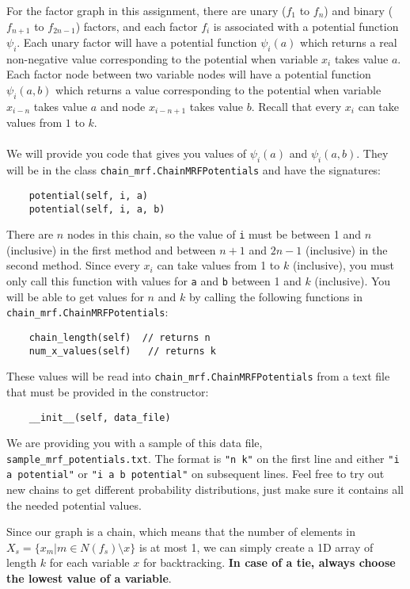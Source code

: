 \documentclass[11pt]{article}
\newcommand{\code}[1]{{\footnotesize \tt #1}}
\begin{document}
For the factor graph in this assignment, there are unary ($f_1$ to $f_n$) and binary ($f_{n+1}$ to $f_{2n-1}$) factors, and each factor $f_i$ is associated with a potential function $\psi_i$.
Each unary factor will have a potential function $\psi_{i}(a)$ which returns a real non-negative value corresponding to the potential when variable $x_{i}$ takes value $a$. Each factor node between two variable nodes will have a potential function $\psi_{i}(a, b)$ which returns a value corresponding to the potential when variable $x_{i-n}$ takes value $a$ and node $x_{i-n+1}$ takes value $b$. Recall that every $x_i$ can take values from $1$ to $k$.\\
\\
We will provide you code that gives you values of $\psi_i(a)$ and $\psi_i(a, b)$. They will be in the class \code{chain\_mrf.ChainMRFPotentials} and have the signatures:
\begin{verbatim}
    potential(self, i, a)
    potential(self, i, a, b)
\end{verbatim}
There are $n$ nodes in this chain, so the value of \code{i} must be between 1 and $n$ (inclusive) in the first method and between $n+1$ and $2n-1$ (inclusive) in the second method. Since every $x_i$ can take values from 1 to $k$ (inclusive), you must only call this function with values for \code{a} and \code{b} between 1 and $k$ (inclusive). You will be able to get values for $n$ and $k$ by calling the following functions in \code{chain\_mrf.ChainMRFPotentials}:
\begin{verbatim}
    chain_length(self)  // returns n
    num_x_values(self)   // returns k
\end{verbatim}
These values will be read into \code{chain\_mrf.ChainMRFPotentials} from a text file that must be provided in the constructor:
\begin{verbatim}
    __init__(self, data_file)
\end{verbatim}
We are providing you with a sample of this data file, \code{sample\_mrf\_potentials.txt}. The format is \code{"n k"} on the first line and either \code{"i a potential"} or \code{"i a b potential"} on subsequent lines. Feel free to try out new chains to get different probability distributions, just make sure it contains all the needed potential values.

Since our graph is a chain, which means that the number of elements in $X_s=\{x_m|m \in N(f_s) \setminus x\}$ is at most 1, we can simply create a 1D array of length $k$ for each variable $x$ for backtracking. \textbf{In case of a tie, always choose the lowest value of a variable}.
\end{document}
